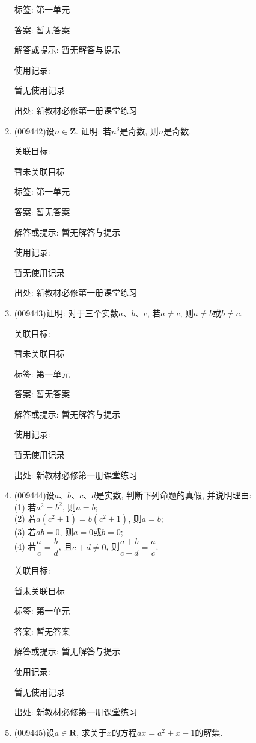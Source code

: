 \documentclass[10pt,a4paper]{article}
\begin{document}
\begin{enumerate}[1.]
标签: 第一单元

答案: 暂无答案

解答或提示: 暂无解答与提示

使用记录:

暂无使用记录


出处: 新教材必修第一册课堂练习
\item { (009442)}设$n\in \mathbf{Z}$. 证明: 若$n^3$是奇数, 则$n$是奇数.


关联目标:

暂未关联目标



标签: 第一单元

答案: 暂无答案

解答或提示: 暂无解答与提示

使用记录:

暂无使用记录


出处: 新教材必修第一册课堂练习
\item { (009443)}证明: 对于三个实数$a$、$b$、$c$, 若$a\ne c$, 则$a\ne b$或$b\ne c$.


关联目标:

暂未关联目标



标签: 第一单元

答案: 暂无答案

解答或提示: 暂无解答与提示

使用记录:

暂无使用记录


出处: 新教材必修第一册课堂练习
\item { (009444)}设$a$、$b$、$c$、$d$是实数, 判断下列命题的真假, 并说明理由:\\
(1) 若$a^2=b^2$, 则$a=b$;\\
(2) 若$a(c^2+1)=b(c^2+1)$, 则$a=b$;\\
(3) 若$ab=0$, 则$a=0$或$b=0$;\\
(4) 若$\dfrac ac=\dfrac bd$, 且$c+d\ne 0$, 则$\dfrac{a+b}{c+d}=\dfrac ac$.


关联目标:

暂未关联目标



标签: 第一单元

答案: 暂无答案

解答或提示: 暂无解答与提示

使用记录:

暂无使用记录


出处: 新教材必修第一册课堂练习
\item { (009445)}设$a\in \mathbf{R}$, 求关于$x$的方程$ax=a^2+x-1$的解集.



\end{enumerate}
\end{document}
